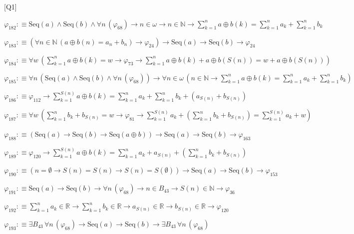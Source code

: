 \begin{fullproof}{[Q1]}
\begin{abbrevlist}
\item $\varphi_{182} :\equiv \mathrm{Seq}(a) \land \mathrm{Seq}(b) \land \forall n\,(\varphi_{68}) \to n \in \omega \to n \in \mathbb{N} \to {\textstyle\sum_{k=1}^{n} a \oplus b(k)} = {\textstyle\sum_{k=1}^{n} a_{k}} + {\textstyle\sum_{k=1}^{n} b_{k}}$
\item $\varphi_{183} :\equiv (\forall n \in \mathbb{N}\,(a \oplus b(n) = a_{n} + b_{n}) \to \varphi_{24}) \to \mathrm{Seq}(a) \to \mathrm{Seq}(b) \to \varphi_{24}$
\item $\varphi_{184} :\equiv \forall w\,({\textstyle\sum_{k=1}^{n} a \oplus b(k)} = w \to \varphi_{73} \to {\textstyle\sum_{k=1}^{n} a \oplus b(k)} + a \oplus b(S(n)) = w + a \oplus b(S(n)))$
\item $\varphi_{185} :\equiv \forall n\,(\mathrm{Seq}(a) \land \mathrm{Seq}(b) \land \forall n\,(\varphi_{68})) \to \forall n \in \omega\,(n \in \mathbb{N} \to {\textstyle\sum_{k=1}^{n} a \oplus b(k)} = {\textstyle\sum_{k=1}^{n} a_{k}} + {\textstyle\sum_{k=1}^{n} b_{k}})$
\item $\varphi_{186} :\equiv \varphi_{112} \to {\textstyle\sum_{k=1}^{S(n)} a \oplus b(k)} = {\textstyle\sum_{k=1}^{n} a_{k}} + {\textstyle\sum_{k=1}^{n} b_{k}} + (a_{S(n)} + b_{S(n)})$
\item $\varphi_{187} :\equiv \forall w\,({\textstyle\sum_{k=1}^{n} b_{k}} + b_{S(n)} = w \to \varphi_{81} \to {\textstyle\sum_{k=1}^{S(n)} a_{k}} + ({\textstyle\sum_{k=1}^{n} b_{k}} + b_{S(n)}) = {\textstyle\sum_{k=1}^{S(n)} a_{k}} + w)$
\item $\varphi_{188} :\equiv (\mathrm{Seq}(a) \to \mathrm{Seq}(b) \to \mathrm{Seq}(a \oplus b)) \to \mathrm{Seq}(a) \to \mathrm{Seq}(b) \to \varphi_{163}$
\item $\varphi_{189} :\equiv \varphi_{120} \to {\textstyle\sum_{k=1}^{S(n)} a \oplus b(k)} = {\textstyle\sum_{k=1}^{n} a_{k}} + a_{S(n)} + ({\textstyle\sum_{k=1}^{n} b_{k}} + b_{S(n)})$
\item $\varphi_{190} :\equiv (n = \emptyset \to S(n) = S(n) \to S(n) = S(\emptyset)) \to \mathrm{Seq}(a) \to \mathrm{Seq}(b) \to \varphi_{153}$
\item $\varphi_{191} :\equiv \mathrm{Seq}(a) \to \mathrm{Seq}(b) \to \forall n\,(\varphi_{68}) \to n \in B_{43} \to S(n) \in \mathbb{N} \to \varphi_{36}$
\item $\varphi_{192} :\equiv {\textstyle\sum_{k=1}^{n} a_{k}} \in \mathbb{R} \to {\textstyle\sum_{k=1}^{n} b_{k}} \in \mathbb{R} \to a_{S(n)} \in \mathbb{R} \to b_{S(n)} \in \mathbb{R} \to \varphi_{120}$
\item $\varphi_{193} :\equiv \exists B_{43}\,\forall n\,(\varphi_{68}) \to \mathrm{Seq}(a) \to \mathrm{Seq}(b) \to \exists B_{43}\,\forall n\,(\varphi_{68})$

\end{abbrevlist}
\end{fullproof}
